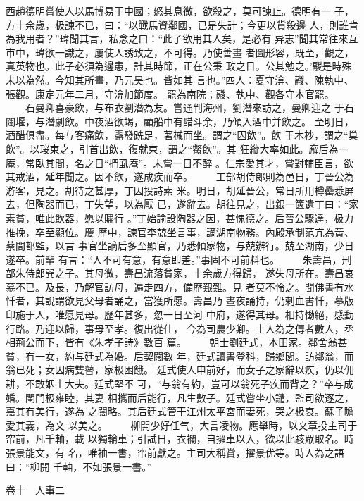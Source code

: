 \documentclass{ctexart}
\begin{document}
西趙德明嘗使人以馬博易于中國；怒其息微，欲殺之，莫可諫止。德明有一 子，方十余歲，极諫不已，曰：``以戰馬資鄰國，已是失計；今更以貨殺邊 人，則誰肯為我用者？''瑋聞其言，私念之曰：``此子欲用其人矣，是必有 异志''聞其常往來互市中，瑋欲一識之，屢使人誘致之，不可得。乃使善畫 者圖形容，既至，觀之，真英物也。此子必須為邊患，計其時節，正在公秉 政之日。公其勉之。'鬷是時殊未以為然。今知其所畫，乃元昊也。皆如其 言也。''四人：夏守渰、鬷、陳執中、張觀。康定元年二月，守渰加節度。 罷為南院；鬷、執中、觀各守本官罷。 　　石曼卿喜豪飲，与布衣劉潛為友。嘗通判海州，劉潛來訪之，曼卿迎之 于石闥堰，与潛劇飲。中夜酒欲竭，顧船中有醋斗余，乃傾入酒中并飲之。 至明日，酒醋俱盡。每与客痛飲，露發跣足，著械而坐。謂之``囚飲''。飲 于木杪，謂之``巢飲''。以珱束之，引首出飲，復就束，謂之``鱉飲''。其 狂縱大率如此。廨后為一庵，常臥其間，名之日``捫虱庵''。未嘗一日不醉 。仁宗愛其才，嘗對輔臣言，欲其戒酒，延年聞之。因不飲，遂成疾而卒。 　　工部胡侍郎則為邑日，丁晉公為游客，見之。胡待之甚厚，丁因投詩索 米。明日，胡延晉公，常日所用樽罍悉屏去，但陶器而已，丁失望，以為厭 已，遂辭去。胡往見之，出銀一篋遺丁曰：``家素貧，唯此飲器，愿以贐行 。''丁始諭設陶器之因，甚愧德之。后晉公驟達，极力推挽，卒至顯位。慶 歷中，諫官李兢坐言事，謫湖南物務。內殿承制范亢為黃、蔡間都監，以言 事官坐謫后多至顯官，乃悉傾家物，与兢辦行。兢至湖南，少日遂卒。前輩 有言：``人不可有意，有意即差。''事固不可前料也。 　　朱壽昌，刑部朱侍郎巽之子。其母微，壽昌流落貧家，十余歲方得歸， 遂失母所在。壽昌哀慕不已。及長，乃解官訪母，遍走四方，備歷艱難。見 者莫不怜之。聞佛書有水忏者，其說謂欲見父母者誦之，當獲所愿。壽昌乃 晝夜誦持，仍剌血書忏，摹版印施于人，唯愿見母。歷年甚多，忽一日至河 中府，遂得其母。相持慟絕，感動行路。乃迎以歸，事母至孝。復出從仕， 今為司農少卿。士人為之傳者數人，丞相荊公而下，皆有《朱孝子詩》數百 篇。 　　朝士劉廷式，本田家。鄰舍翁甚貧，有一女，約与廷式為婚。后契闊數 年，廷式讀書登科，歸鄉閭。訪鄰翁，而翁已死；女因病雙瞽，家极困餓。 廷式使人申前好，而女子之家辭以疾，仍以佣耕，不敢姻士大夫。廷式堅不 可，``与翁有約，豈可以翁死子疾而背之？''卒与成婚。閨門极雍睦，其妻 相攜而后能行，凡生數子。廷式嘗坐小譴，監司欲逐之，嘉其有美行，遂為 之闊略。其后廷式管干江州太平宮而妻死，哭之极哀。蘇子瞻愛其義，為文 以美之。 　　柳開少好任气，大言凌物。應舉時，以文章投主司于帘前，凡千軸，載 以獨輪車；引試日，衣襴，自擁車以入，欲以此駭眾取名。時張景能文，有 名，唯袖一書，帘前獻之。主司大稱賞，擢景优等。時人為之語曰：``柳開 千軸，不如張景一書。''

卷十　人事二
\end{document}
